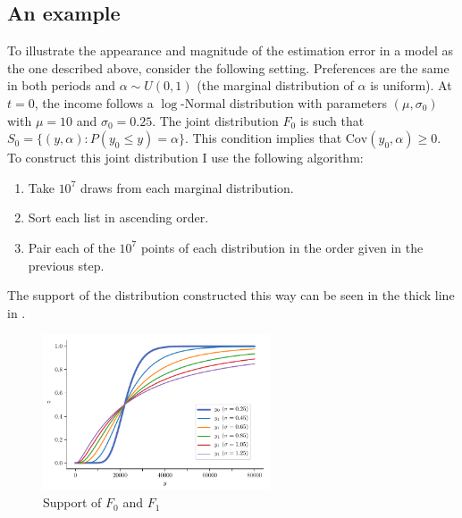\documentclass[english, a4paper, 12pt]{article}
\begin{document}
\subsection{An example} \label{ssec:RAexample}
To illustrate the appearance and magnitude of the estimation error in a model as the one described above, consider the following setting. Preferences are the same in both periods and $\alpha \sim U(0,1)$ (the marginal distribution of $\alpha$ is uniform). At $t = 0$, the income follows a $\log$-Normal distribution with parameters $(\mu, \sigma_{0})$ with $\mu = 10$ and $\sigma_{0} = 0.25$. The joint distribution $F_{0}$ is such that $S_{0} = \{(y,\alpha) : P(y_{0} \leq y) = \alpha\}$. This condition implies that $\mathrm{Cov}(y_{0}, \alpha) \geq 0$. To construct this joint distribution I use the following algorithm:
	\begin{enumerate}
		\item Take $10^{7}$ draws from each marginal distribution.
		\item Sort each list in ascending order.
		\item Pair each of the $10^{7}$ points of each distribution in the order given in the previous step.
	\end{enumerate}
The support of the distribution constructed this way can be seen in the thick line in . 
	\begin{figure}
		\caption{Support of $F_{0}$ and $F_{1}$}
		\label{fig:JointDistributions}
		\includegraphics[width = 0.6\textwidth]{RAjointDistribs}
		\vspace{-1ex}
	\end{figure}
	
\end{document}
